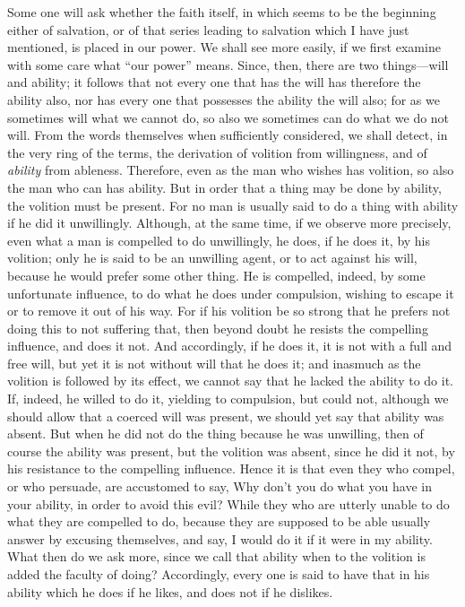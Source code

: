 \documentclass[10pt, twocolumn, oneside, a4paper]{memoir}
\begin{document}
Some one will ask whether the faith itself, in which seems to be the beginning either of salvation, or of that series leading to salvation which I have just mentioned, is placed in our power. We shall see more easily, if we first examine with some care what ``our power'' means. Since, then, there are two things—will and ability; it follows that not every one that has the will has therefore the ability also, nor has every one that possesses the ability the will also; for as we sometimes will what we cannot do, so also we sometimes can do what we do not will. From the words themselves when sufficiently considered, we shall detect, in the very ring of the terms, the derivation of volition from willingness, and of \textit{ability} from ableness.  Therefore, even as the man who wishes has volition, so also the man who can has ability. But in order that a thing may be done by ability, the volition must be present. For no man is usually said to do a thing with ability if he did it unwillingly. Although, at the same time, if we observe more precisely, even what a man is compelled to do unwillingly, he does, if he does it, by his volition; only he is said to be an unwilling agent, or to act against his will, because he would prefer some other thing. He is compelled, indeed, by some unfortunate influence, to do what he does under compulsion, wishing to escape it or to remove it out of his way. For if his volition be so strong that he prefers not doing this to not suffering that, then beyond doubt he resists the compelling influence, and does it not. And accordingly, if he does it, it is not with a full and free will, but yet it is not without will that he does it; and inasmuch as the volition is followed by its effect, we cannot say that he lacked the ability to do it. If, indeed, he willed to do it, yielding to compulsion, but could not, although we should allow that a coerced will was present, we should yet say that ability was absent. But when he did not do the thing because he was unwilling, then of course the ability was present, but the volition was absent, since he did it not, by his resistance to the compelling influence. Hence it is that even they who compel, or who persuade, are accustomed to say, Why don't you do what you have in your ability, in order to avoid this evil? While they who are utterly unable to do what they are compelled to do, because they are supposed to be able usually answer by excusing themselves, and say, I would do it if it were in my ability. What then do we ask more, since we call that ability when to the volition is added the faculty of doing? Accordingly, every one is said to have that in his ability which he does if he likes, and does not if he dislikes.
\end{document}
